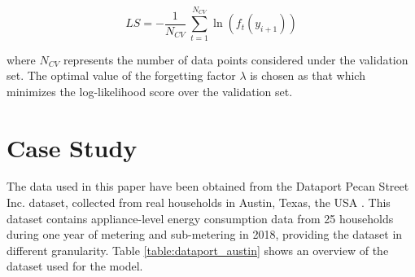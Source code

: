 \begin{equation}
    LS = - \frac{1}{N_{CV}} \ \sum_{t=1}^{N_{CV}} \ln \left(f_{t}(y_{i+1})\right)
\end{equation}

where $N_{CV}$ represents the number of data points considered under the validation set.
The optimal value of the forgetting factor $\lambda$ is chosen as that which minimizes the log-likelihood score  over the validation set. 

\section{Case Study} \label{Sect:CaseStudy}
The data used in this paper have been obtained from the Dataport Pecan Street Inc. dataset, collected from real households in Austin, Texas, the USA \cite{PecanStreetInc}. This dataset contains appliance-level energy consumption data from 25 households during one year of metering and sub-metering in 2018, providing the dataset in different granularity. Table \ref{table:dataport_austin} shows an overview of the dataset used for the model.

\begin{table}[]
\centering
\caption{Dataport dataset overview: Austin, Texas}
\label{table:dataport_austin}
\end{table}

